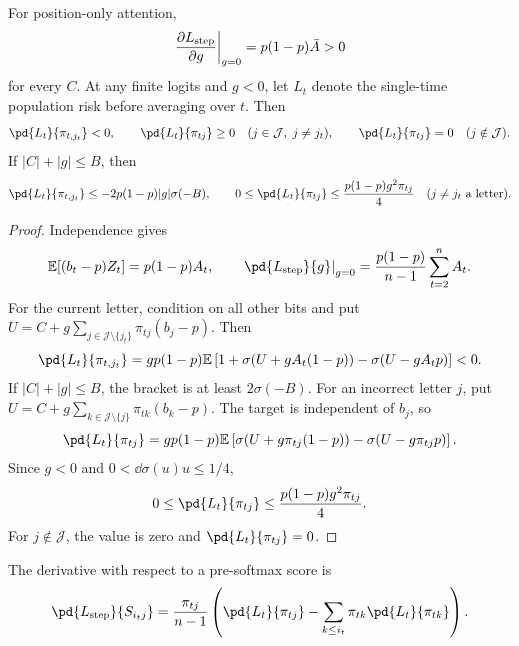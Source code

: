 \begin{lrlemma}
\label{lem:lr-signs}
For position-only attention,
\begin{equation}\label{eq:lr-initial-gate-gradient}
 \left.\frac{\partial L_{\mathrm{step}}}{\partial g}\right|_{g=0}
 =p(1-p)\bar A>0
\end{equation}
for every $C$. At any finite logits and $g<0$, let $L_t$ denote the single-time population risk before averaging over $t$. Then
\begin{equation}\label{eq:lr-feature-source-signs}
 \pd{L_t}{\pi_{t,j_t}}<0,\qquad \pd{L_t}{\pi_{tj}}\ge0
 \quad(j\in\mathcal J,\;j\ne j_t),\qquad
 \pd{L_t}{\pi_{tj}}=0\quad(j\notin\mathcal J).
\end{equation}
If $|C|+|g|\le B$, then
\begin{equation}\label{eq:lr-source-bounds}
 \pd{L_t}{\pi_{t,j_t}}\le-2p(1-p)|g|\sigma(-B),\qquad
 0\le \pd{L_t}{\pi_{tj}}\le\frac{p(1-p) g^2\pi_{tj}}4\quad(j\ne j_t\text{ a letter}).
\end{equation}
\end{lrlemma}
\begin{proof}
Independence gives
\[
 \mathbb E[(b_t-p)Z_t]=p(1-p)A_t,\qquad
 \left.\pd{\LRstep}{g}\right|_{g=0}
 =\frac{p(1-p)}{n-1}\sum_{t=2}^n A_t.
\]
For the current letter, condition on all other bits and put
$U=C+g\sum_{j\in\mathcal J\setminus\{j_t\}}\pi_{tj}(b_j-p)$. Then
\[
 \pd{L_t}{\pi_{t,j_t}}=gp(1-p)\mathbb E
 \left[1+\sigma(U+gA_t(1-p))-\sigma(U-gA_tp)\right]<0.
\]
If $|C|+|g|\le B$, the bracket is at least $2\sigma(-B)$.
For an incorrect letter $j$, put
$U=C+g\sum_{k\in\mathcal J\setminus\{j\}}\pi_{tk}(b_k-p)$.
The target is independent of $b_j$, so
\[
 \pd{L_t}{\pi_{tj}}=gp(1-p)\mathbb E
 \left[\sigma(U+g\pi_{tj}(1-p))-\sigma(U-g\pi_{tj}p)\right].
\]
Since $g<0$ and $0<\dd{\sigma(u)}{u}\le1/4$,
\[
 0\le\pd{L_t}{\pi_{tj}}\le\frac{p(1-p)g^2\pi_{tj}}4.
\]
For $j\notin\mathcal J$, the value is zero and $\pd{L_t}{\pi_{tj}}=0$.
\end{proof}

The derivative with respect to a pre-softmax score is
\begin{equation}
 \pd{\LRstep}{S_{i_tj}}=\frac{\pi_{tj}}{n-1}
 \left(\pd{L_t}{\pi_{tj}}-\sum_{k\le i_t}\pi_{tk}\pd{L_t}{\pi_{tk}}\right).
\end{equation}

